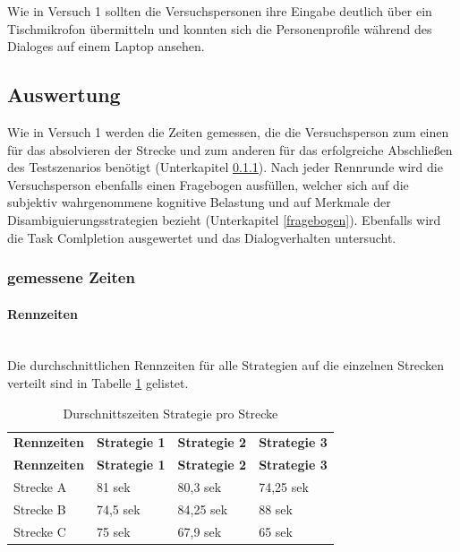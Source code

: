 \documentclass[12pt,a4paper]{scrartcl}
\begin{document}
Wie in Versuch 1 sollten die Versuchspersonen ihre Eingabe deutlich über ein Tischmikrofon übermitteln und konnten sich die Personenprofile während des Dialoges auf einem Laptop ansehen.



\subsection{Auswertung}
\label{auswertung2}
Wie in Versuch 1 werden die Zeiten gemessen, die die Versuchsperson zum einen für das absolvieren der Strecke und zum anderen für das erfolgreiche Abschließen des Testszenarios benötigt (Unterkapitel \ref{messwerte}).
Nach jeder Rennrunde wird die Versuchsperson ebenfalls einen Fragebogen ausfüllen, welcher sich auf die subjektiv wahrgenommene kognitive Belastung und auf Merkmale der Disambiguierungsstrategien bezieht (Unterkapitel \ref{fragebogen}). Ebenfalls wird die Task Comlpletion ausgewertet und das Dialogverhalten untersucht. 
\subsubsection{gemessene Zeiten}
\label{messwerte}
\paragraph{Rennzeiten} 
~\\

Die durchschnittlichen Rennzeiten für alle Strategien auf die einzelnen Strecken verteilt sind in Tabelle \ref{RZ3SV2} gelistet. 
\begin{longtable}{p{3cm}p{3cm}p{3cm}p{3cm} }
	\label{RZ3SV2}\\
	\caption[Durschnittszeiten Strategie pro Strecke]{Durschnittszeiten Strategie pro Strecke}\\
	\hline
	\textbf{Rennzeiten}&\textbf{Strategie 1}&\textbf{Strategie 2} &\textbf{Strategie 3}\\
	\hline
	\endfirsthead
	\hline
	\textbf{Rennzeiten}&\textbf{Strategie 1}&\textbf{Strategie 2} &\textbf{Strategie 3}\\
	\hline
	\endhead
Strecke A & 81 sek & 80,3 sek & 74,25 sek \\
Strecke B & 74,5 sek & 84,25 sek & 88 sek \\
Strecke C & 75 sek & 67,9 sek & 65 sek \\
\hline
\end{longtable}
\end{document}

